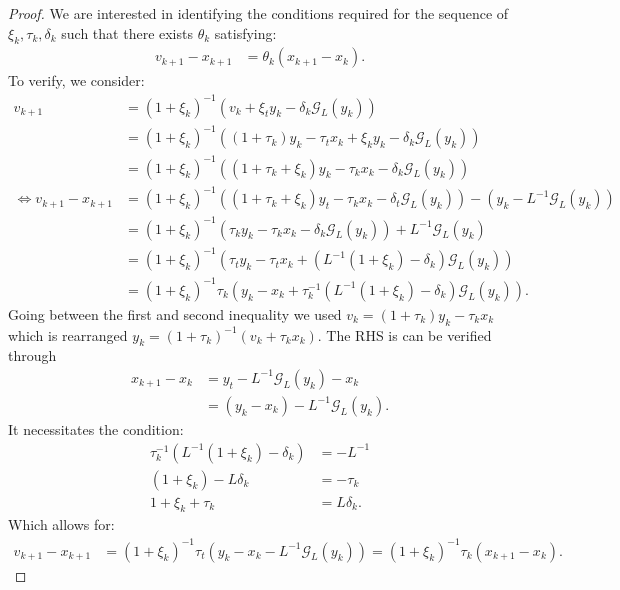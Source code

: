 \documentclass[12pt]{article}
\begin{document}
    \begin{proof}
        We are interested in identifying the conditions required for the sequence of $\xi_k, \tau_k, \delta_k$ such that there exists $\theta_k$ satisfying:
        \begin{align*}
            v_{k + 1} - x_{k + 1}
            &= \theta_k(x_{k + 1} - x_k).
        \end{align*}
        To verify, we consider:
        \begin{align*}
            v_{k + 1} &=
            (1 + \xi_k)^{-1}(v_k + \xi_t y_k - \delta_k \mathcal G_L(y_k))
            \\
            &=
            (1 + \xi_k)^{-1}((1 + \tau_k)y_k - \tau_t x_k + \xi_k y_k - \delta_k \mathcal G_L(y_k))
            \\
            &=
            (1 + \xi_k)^{-1}((1 + \tau_k + \xi_k)y_k - \tau_k x_k - \delta_k \mathcal G_L(y_k))
            \\
            \iff
            v_{k + 1} - x_{k + 1}
            &=
            (1 + \xi_k)^{-1}((1 + \tau_k + \xi_k)y_t - \tau_k x_k - \delta_t \mathcal G_L(y_k))
            - (y_k - L^{-1}\mathcal G_L(y_k))
            \\
            &=
            (1 + \xi_k)^{-1}(\tau_ky_k - \tau_k x_k - \delta_k \mathcal G_L(y_k))
            + L^{-1}\mathcal G_L(y_k)
            \\
            &=
            (1 + \xi_k)^{-1}
            \left(
                \tau_ty_k - \tau_t x_k + (L^{-1}(1 + \xi_k) - \delta_k) \mathcal G_L(y_k)
            \right)
            \\
            &=
            (1 + \xi_k)^{-1}\tau_k
            \left(
                y_k - x_k +
                \tau_k^{-1}(L^{-1}(1 + \xi_k) - \delta_k) \mathcal G_L(y_k)
            \right).
        \end{align*}
        Going between the first and second inequality we used $v_k = (1 + \tau_k)y_k - \tau_k x_k$ which is rearranged $y_k = (1 + \tau_k)^{-1}(v_k + \tau_k x_k)$.
        The RHS is can be verified through
        \begin{align*}
            x_{k + 1} - x_k &=
            y_t - L^{-1}\mathcal G_L(y_k) - x_k
            \\
            &= (y_k - x_k) - L^{-1}\mathcal G_L(y_k).
        \end{align*}
        It necessitates the condition:
        \begin{align*}
            \tau_k^{-1}(L^{-1}(1 + \xi_k) - \delta_k)
            &= - L^{-1}
            \\
            (1 + \xi_k) - L\delta_k
            &=
            - \tau_k
            \\
            1 + \xi_k + \tau_k
            &=
            L\delta_k.
        \end{align*}
        Which allows for:
        \begin{align*}
            v_{k + 1} - x_{k + 1} &=
            (1 + \xi_k)^{-1}\tau_t
            \left(y_k - x_k - L^{-1}\mathcal G_L(y_k)\right)
            =
            (1 + \xi_k)^{-1}\tau_k(x_{k + 1} - x_k).
        \end{align*}
    \end{proof}
\end{document}
